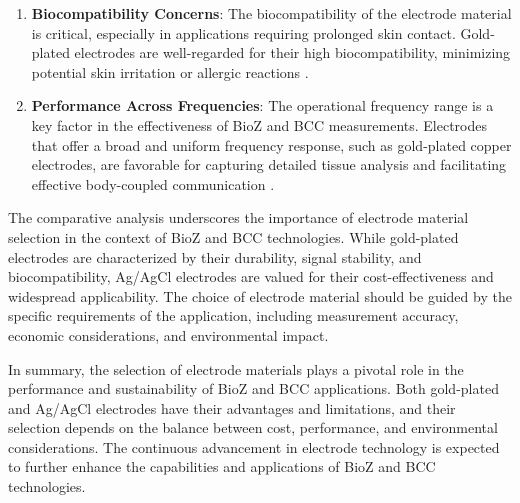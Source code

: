 {\begin{enumerate}
    \item \textbf{Biocompatibility Concerns}: The biocompatibility of the electrode material is critical, especially in applications requiring prolonged skin contact. Gold-plated electrodes are well-regarded for their high biocompatibility, minimizing potential skin irritation or allergic reactions \cite{Almeida2014On-site}.
    
    \item \textbf{Performance Across Frequencies}: The operational frequency range is a key factor in the effectiveness of BioZ and BCC measurements. Electrodes that offer a broad and uniform frequency response, such as gold-plated copper electrodes, are favorable for capturing detailed tissue analysis and facilitating effective body-coupled communication \cite{s23094251}.
    
\end{enumerate}

The comparative analysis underscores the importance of electrode material selection in the context of BioZ and BCC technologies. While gold-plated electrodes are characterized by their durability, signal stability, and biocompatibility, Ag/AgCl electrodes are valued for their cost-effectiveness and widespread applicability. The choice of electrode material should be guided by the specific requirements of the application, including measurement accuracy, economic considerations, and environmental impact.

In summary, the selection of electrode materials plays a pivotal role in the performance and sustainability of BioZ and BCC applications. Both gold-plated and Ag/AgCl electrodes have their advantages and limitations, and their selection depends on the balance between cost, performance, and environmental considerations. The continuous advancement in electrode technology is expected to further enhance the capabilities and applications of BioZ and BCC technologies.

}
